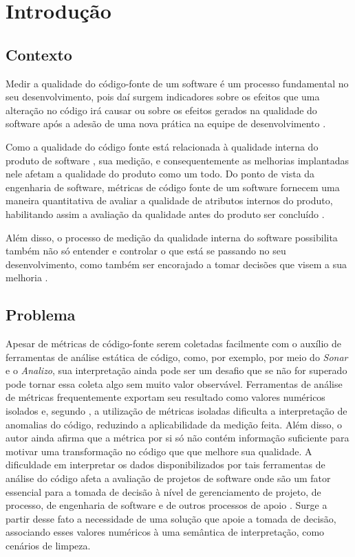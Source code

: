 \chapter{Introdução}

\section{Contexto}

Medir a qualidade do código-fonte  de um software é um processo fundamental no seu desenvolvimento, pois daí surgem indicadores sobre os efeitos que uma alteração no código irá causar ou sobre os efeitos gerados na qualidade do software após a adesão de uma nova prática na equipe de desenvolvimento \cite{Fenton98}. 

Como a qualidade do código fonte está relacionada à qualidade interna do produto de software \cite{ISO25023}, sua medição, e consequentemente as melhorias implantadas nele afetam a qualidade do produto como um todo. Do ponto de vista da engenharia de software, métricas de código fonte de um software fornecem uma maneira quantitativa de avaliar a qualidade de atributos internos do produto, habilitando assim a avaliação da qualidade antes do produto ser concluído \cite{pressman_engenharia_2010}.

Além disso, o processo de medição da qualidade interna do software possibilita também não só entender e controlar o que está se passando no seu desenvolvimento, como também ser encorajado a tomar decisões que visem a sua melhoria \cite{Fenton98}.
 
\section{Problema}
\label{intro_problema}

Apesar de métricas de código-fonte serem coletadas facilmente com o auxílio de ferramentas de análise estática de código, como, por exemplo, por meio do \textit{Sonar} e o \textit{Analizo}, sua interpretação ainda pode ser um desafio que se não for superado pode tornar essa coleta algo sem muito valor observável. Ferramentas de análise de métricas frequentemente exportam seu resultado como valores numéricos isolados \cite{Meirelles2013} e, segundo , a utilização de métricas isoladas dificulta a interpretação de anomalias do código, reduzindo a aplicabilidade da medição feita. Além disso, o autor ainda afirma que a métrica por si só não contém informação suficiente para motivar uma transformação no código que que melhore sua qualidade. A dificuldade em interpretar os dados disponibilizados por tais ferramentas de análise do código afeta a avaliação de projetos de software onde são um fator essencial para a tomada de decisão à nível de gerenciamento de projeto, de processo, de engenharia de software e de outros processos de apoio \cite{pandian_software_2004}. Surge a partir desse fato a necessidade de uma solução que apoie a tomada de decisão, associando esses valores numéricos à uma semântica de interpretação, como cenários de limpeza. 

